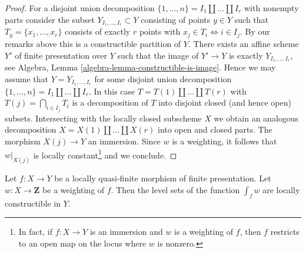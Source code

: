 \begin{proof}
\medskip\noindent
For a disjoint union decomposition
$\{1, \ldots, n\} = I_1 \amalg \ldots \amalg I_r$ with nonempty parts
consider the subset $Y_{I_1, \ldots, I_r} \subset Y$
consisting of points $y \in Y$ such that $T_y = \{x_1, \ldots, x_r\}$
consists of exactly $r$ points with $x_j \in T_i \Leftrightarrow i \in I_j$.
By our remarks above this is a constructible partition of $Y$.
There exists an affine scheme $Y'$ of finite presentation
over $Y$ such that the image of $Y' \to Y$ is exactly
$Y_{I_1, \ldots, I_r}$, see Algebra, Lemma
\ref{algebra-lemma-constructible-is-image}.
Hence we may assume that $Y = Y_{I_1, \ldots, I_r}$ for some
disjoint union decomposition
$\{1, \ldots, n\} = I_1 \amalg \ldots \amalg I_r$.
In this case $T = T(1) \amalg \ldots \amalg T(r)$ with
$T(j) = \bigcap_{i \in I_j} T_i$
is a decomposition of $T$ into disjoint closed (and hence open) subsets.
Intersecting with the locally closed subscheme $X$ we obtain an analogous
decomposition $X = X(1) \amalg \ldots \amalg X(r)$ into open and closed parts.
The morphism $X(j) \to Y$ an immersion.
Since $w$ is a weighting, it follows that $w|_{X(j)}$
is locally constant\footnote{In fact, if $f : X \to Y$ is an
immersion and $w$ is a weighting of $f$, then $f$ restricts to an
open map on the locus where $w$ is nonzero.} and we conclude.
\end{proof}

\begin{lemma}
\label{lemma-jumps-int-w}
Let $f : X \to Y$ be a locally quasi-finite morphism of finite
presentation. Let $w : X \to \mathbf{Z}$ be a weighting of $f$. Then
the level sets of the function $\int_f w$ are locally constructible in $Y$.
\end{lemma}

